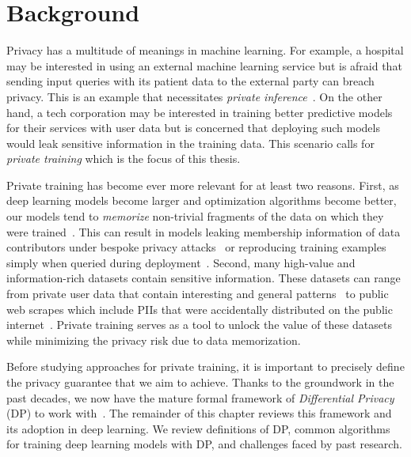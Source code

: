 \chapter{Background}\label{ch_2}

Privacy has a multitude of meanings in machine learning.
For example, a hospital may be interested in using an external machine learning service but is afraid that sending input queries with its patient data to the external party can breach privacy.
This is an example that necessitates \emph{private inference}~\cite{tramer2018slalom,h100_confidential_computing}.
On the other hand, a tech corporation may be interested in training better predictive models for their services with user data but is concerned that deploying such models would leak sensitive information in the training data.
This scenario calls for \emph{private training} which is the focus of this thesis. 

Private training has become ever more relevant for at least two reasons. 
First, as deep learning models become larger and optimization algorithms become better, our models tend to \emph{memorize} non-trivial fragments of the data on which they were trained~\cite{DBLP:journals/corr/ZhangBHRV16,feldman2020neural,feldman2020does,brown2021memorization}.
This can result in models leaking membership information of data contributors under bespoke privacy attacks~\cite{shokri2017membership} or reproducing training examples simply when queried during deployment~\cite{carlini2020extracting,nasr2023scalable}.
Second, many high-value and information-rich datasets contain sensitive information.
These datasets can range from private user data that contain interesting and general patterns~\cite{google-2019} to public web scrapes which include PIIs that were accidentally distributed on the public internet~\cite{carlini2020extracting}.
Private training serves as a tool to unlock the value of these datasets while minimizing the privacy risk due to data memorization.

Before studying approaches for private training, it is important to precisely define the privacy guarantee that we aim to achieve.
Thanks to the groundwork in the past decades, we now have the mature formal framework of \emph{Differential Privacy} (DP) to work with~\cite{dwork2006calibrating,dwork2014algorithmic}.
The remainder of this chapter reviews this framework and its adoption in deep learning.
We review definitions of DP, common algorithms for training deep learning models with DP, and challenges faced by past research.

